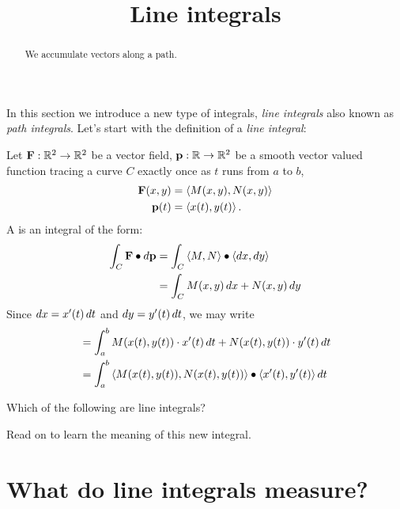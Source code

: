 \documentclass{ximera}
\title[Dig-In:]{Line integrals}
\begin{document}
\begin{abstract}
We accumulate vectors along a path.
\end{abstract}
\maketitle

In this section we introduce a new type of integrals, \textit{line
  integrals} also known as \textit{path integrals}. Let's start with
the definition of a \textit{line integral}:


\begin{definition}
Let $\mathbf{F}:\mathbb R^2\to\mathbb R^2$ be a vector field, $\mathbf{p}:\mathbb R\to\mathbb R^2$ be a
smooth vector valued function tracing a curve $C$ exactly once as $t$
runs from $a$ to $b$,
\begin{align*}
  \mathbf{F}(x,y) &= \left\langle M(x,y), N(x,y)\right\rangle\\
  \mathbf{p}(t) &= \left\langle x(t),y(t)\right\rangle.
\end{align*}
A  is an integral of the form:
\begin{align*}
\int_C \mathbf{F}\bullet \mathop{}\!d \mathbf{p} &= \int_C \left\langle M,N\right\rangle\bullet\left\langle \mathop{}\!d x,\mathop{}\!d y\right\rangle\\
&= \int_C M(x,y)\mathop{}\!d x + N(x,y)\mathop{}\!d y
\end{align*}
Since $\mathop{}\!d x = x'(t)\mathop{}\!d t$ and $\mathop{}\!d y = y'(t)\mathop{}\!d t$, we may write
\begin{align*}
&= \int_a^b M(x(t),y(t))\cdot x'(t) \mathop{}\!d t + N(x(t),y(t))\cdot  y'(t) \mathop{}\!d t\\
&= \int_a^b \left\langle M(x(t),y(t)),N(x(t),y(t))\right\rangle\bullet\left\langle x'(t), y'(t)\right\rangle \mathop{}\!d t
\end{align*}
\end{definition}

\begin{question}
  Which of the following are line integrals?
  \begin{multipleChoice}
  \end{multipleChoice}
\end{question}

Read on to learn the meaning of this new integral.


\section{What do line integrals measure?}
\end{document}
